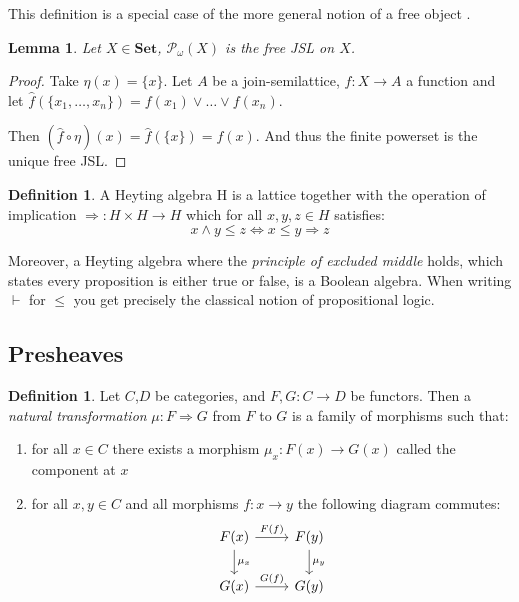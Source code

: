 \documentclass[12pt]{article}
\newtheorem{lemma}[theorem]{Lemma}
\theoremstyle{definition}
\newtheorem{definition}[theorem]{Definition}
\newcommand{\1}{\mathbbm{1}}
\newcommand{\finP}{\mathcal{P}_{\omega}}
\newcommand{\Set}{\mathbf{Set}}
\begin{document}
This definition is a special case of the more general notion of a free object \cite{joy_of_cats_2009}.

\begin{lemma}
    Let $X\in \Set$, $\finP(X)$ is the free JSL on $X$.
\end{lemma}

\begin{proof}
    Take $\eta(x) = \{x\}$. Let $A$ be a join-semilattice, $f: X \to A$ a function and let $\hat{f}(\{x_1, \dots, x_n\}) = f(x_1)\vee \dots \vee f(x_n)$.\

    Then $(\hat{f}\circ \eta)(x) = \hat{f}(\{x\}) = f(x)$. And thus the finite powerset is the unique free JSL.
\end{proof}

\begin{definition}
    A Heyting algebra H is a lattice together with the operation of implication $\Rightarrow: H\times H \to H$ which for all $x,y,z\in H$ satisfies:
    \[
        x\wedge y \leq z \iff x\leq y\Rightarrow z
    \]
\end{definition}

Moreover, a Heyting algebra where the \emph{principle of excluded middle} holds, which states every proposition is either true or false, is a Boolean algebra. When writing $\vdash$ for $\leq$ you get precisely the classical notion of propositional logic.

\subsection{Presheaves}
\begin{definition}
    Let $C$,$D$ be categories, and $F,G: C\to D$ be functors. Then a \emph{natural transformation} $\mu: F\Rightarrow G$ from $F$ to $G$ is a family of morphisms such that:
    \begin{enumerate}
        \item for all $x\in C$ there exists a morphism $\mu_x: F(x)\to G(x)$ called the component at $x$
        \item for all $x,y\in C$ and all morphisms $f: x\to y$ the following diagram commutes:
        \begin{equation}\label{eq:nat-trans}
            \begin{tikzcd}
                F(x) \arrow{r}{F(f)} \arrow{d}{\mu_x} & F(y) \arrow{d}{\mu_y} \\
                G(x) \arrow{r}{G(f)} & G(y)
            \end{tikzcd}
        \end{equation}
    \end{enumerate}
\end{definition}
\end{document}
